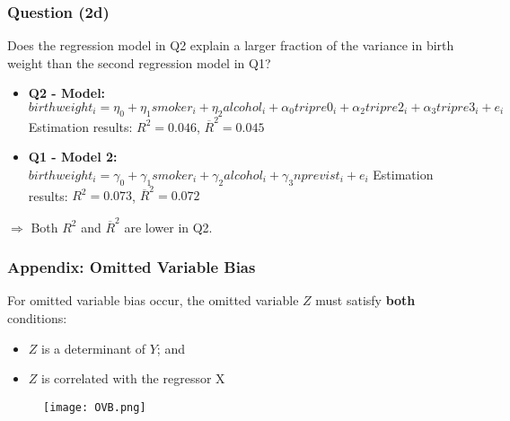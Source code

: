 \documentclass[11pt, xcolor=x11names,compress]{beamer}
\begin{document}
\begin{frame}[fragile,t]
\frametitle{Question (2d)} 
\linespread{1.3}
Does the regression model in Q2 explain a larger fraction of the
variance in birth weight than the second regression model in Q1?

\pause

\vspace{3mm}

\begin{itemize}
    \item \textbf{Q2 - Model:}\\
$birthweight_i=\eta_{0}+\eta_{1} smoker_{i}+\eta_{2} alcohol_{i} + \alpha_{0} tripre0_{i} + \alpha_{2} tripre2_{i} + \alpha_{3} tripre3_{i}+ e_{i}$\\
    Estimation results: $R^2 = 0.046$, $\overline{R}^2 = 0.045$
    \item \textbf{Q1 - Model 2:}\\
$birthweight_i=\gamma_{0}+\gamma_{1} smoker_{i}+\gamma_{2} alcohol_{i} + \gamma_{3} nprevist_{i} + e_{i}$
    Estimation results: $R^2 = 0.073$, $\overline{R}^2 = 0.072$
\end{itemize}

\vspace{3mm}

$\Longrightarrow$ Both $R^2$ and $\overline{R}^2$ are lower in Q2.
\end{frame}

\begin{frame}[fragile,t]
\frametitle{Appendix: Omitted Variable Bias}\label{OVB}
For omitted variable bias occur, the omitted variable $Z$ must satisfy \textbf{both} conditions:
\begin{itemize}
    \item $Z$ is a determinant of $Y$; and
    \item $Z$ is correlated with the regressor X
\end{itemize}
\begin{figure}
    \centering
    \texttt{[image: OVB.png]}
    \caption{}
    \label{fig:my_label}
\end{figure}
 \end{frame}
\end{document}
